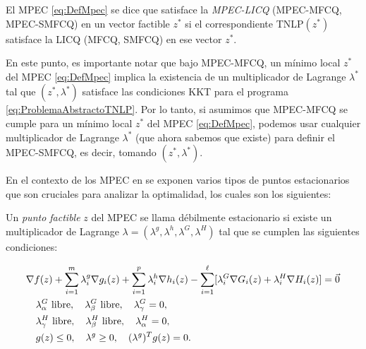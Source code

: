 \begin{definition}
El MPEC \eqref{eq:DefMpec} se dice que satisface la \textit{MPEC-LICQ} (MPEC-MFCQ, MPEC-SMFCQ) en un vector factible $z^*$ si el correspondiente TNLP$(z^*)$ satisface la LICQ (MFCQ, SMFCQ) en ese vector $z^*$.
\end{definition}
    
En este punto, es importante notar que bajo MPEC-MFCQ, un mínimo local $z^*$ del MPEC \eqref{eq:DefMpec} implica la existencia de un multiplicador de Lagrange $\lambda^*$ tal que $(z^*, \lambda^*)$ satisface las condiciones KKT para el programa \eqref{eq:ProblemaAbstractoTNLP}. Por lo tanto, si asumimos que MPEC-MFCQ se cumple para un mínimo local $z^*$ del MPEC \eqref{eq:DefMpec}, podemos usar cualquier multiplicador de Lagrange $\lambda^*$ (que ahora sabemos que existe) para definir el MPEC-SMFCQ, es decir, tomando $(z^*, \lambda^*)$.

En el contexto de los MPEC en \cite{Flegel2003AFJ} se exponen varios tipos de puntos estacionarios que son cruciales para analizar la optimalidad, los cuales son los siguientes:
\begin{definition}
    Un \textit{punto factible} $z$ del MPEC se llama débilmente estacionario si existe un multiplicador de Lagrange $\lambda = (\lambda^g, \lambda^h, \lambda^G, \lambda^H)$ tal que se cumplen las siguientes condiciones:
    
\begin{align}
& \nabla f(z) + \sum_{i=1}^m \lambda_i^g\nabla g_i(z) + \sum_{i=1}^p \lambda_i^h\nabla h_i(z) - \sum_{i=1}^{\ell} [\lambda_i^G\nabla G_i(z) + \lambda_i^H\nabla H_i(z)] = \vec{0} \notag\\
    & \quad \begin{aligned}
        & \lambda_\alpha^G \text{ libre}, \quad \lambda_\beta^G \text{ libre}, \quad \lambda_\gamma^G = 0, \\
        & \lambda_\gamma^H \text{ libre}, \quad \lambda_\beta^H \text{ libre}, \quad \lambda_\alpha^H = 0, \\
        & g(z) \leq 0, \quad \lambda^g \geq 0, \quad (\lambda^g)^T g(z) = 0.
    \end{aligned} \\
& \label{eq:Definicion_punto_debilemente_estacionario} \notag
\end{align}
\end{definition}

